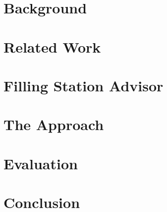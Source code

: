 \documentclass[mestrado]{pacotes/unb-cic}
\begin{document}


%
%
%
%

%

\chapter{Background}
\label{chap:background}


%
%
%
%
%
%


\chapter{Related Work}
\label{chap:related}

%
%
%
%
%
%
%

%


\chapter{Filling Station Advisor}
\label{chap:case_study}



\chapter{The Approach}
\label{chap:proposal}



%
\chapter{Evaluation}
\label{chap:evaluation}

%
\chapter{Conclusion}
\label{chap:conclusion}

%

\postextual
\anexos




\end{document}
